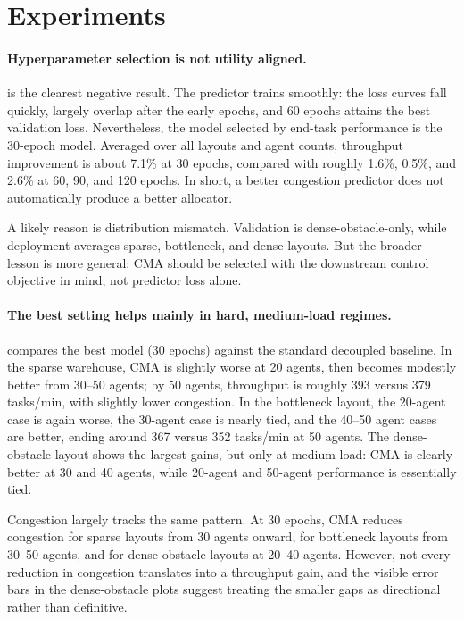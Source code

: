\section{Experiments}
\label{sec:experiments}

\paragraph{Hyperparameter selection is not utility aligned.}
 is the clearest negative result. The predictor trains smoothly: the loss curves fall quickly, largely overlap after the early epochs, and 60 epochs attains the best validation loss. Nevertheless, the model selected by end-task performance is the 30-epoch model. Averaged over all layouts and agent counts, throughput improvement is about 7.1\% at 30 epochs, compared with roughly 1.6\%, 0.5\%, and 2.6\% at 60, 90, and 120 epochs. In short, a better congestion predictor does not automatically produce a better allocator.

A likely reason is distribution mismatch. Validation is dense-obstacle-only, while deployment averages sparse, bottleneck, and dense layouts. But the broader lesson is more general: CMA should be selected with the downstream control objective in mind, not predictor loss alone.

\paragraph{The best setting helps mainly in hard, medium-load regimes.}
 compares the best model (30 epochs) against the standard decoupled baseline. In the sparse warehouse, CMA is slightly worse at 20 agents, then becomes modestly better from 30--50 agents; by 50 agents, throughput is roughly 393 versus 379 tasks/min, with slightly lower congestion. In the bottleneck layout, the 20-agent case is again worse, the 30-agent case is nearly tied, and the 40--50 agent cases are better, ending around 367 versus 352 tasks/min at 50 agents. The dense-obstacle layout shows the largest gains, but only at medium load: CMA is clearly better at 30 and 40 agents, while 20-agent and 50-agent performance is essentially tied.

Congestion largely tracks the same pattern. At 30 epochs, CMA reduces congestion for sparse layouts from 30 agents onward, for bottleneck layouts from 30--50 agents, and for dense-obstacle layouts at 20--40 agents. However, not every reduction in congestion translates into a throughput gain, and the visible error bars in the dense-obstacle plots suggest treating the smaller gaps as directional rather than definitive.

